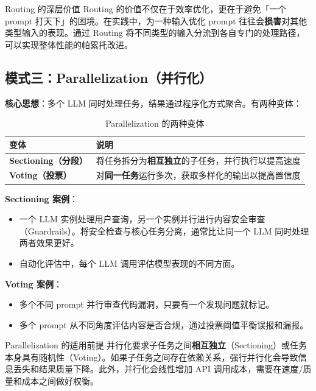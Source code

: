 \begin{knowledgebox}{Routing 的深层价值}
Routing 的价值不仅在于效率优化，更在于避免「一个 prompt 打天下」的困境。在实践中，为一种输入优化 prompt 往往会\textbf{损害}对其他类型输入的表现。通过 Routing 将不同类型的输入分流到各自专门的处理路径，可以实现整体性能的帕累托改进。
\end{knowledgebox}

\subsection{模式三：Parallelization（并行化）}

\textbf{核心思想}：多个 LLM 同时处理任务，结果通过程序化方式聚合。有两种变体：

\begin{table}[H]
\centering
\begin{tabular}{>{\bfseries}l p{10cm}}
\toprule
变体 & 说明 \\
\midrule
Sectioning（分段） & 将任务拆分为\textbf{相互独立}的子任务，并行执行以提高速度 \\
Voting（投票） & 对\textbf{同一任务}运行多次，获取多样化的输出以提高置信度 \\
\bottomrule
\end{tabular}
\caption{Parallelization 的两种变体}
\end{table}

\textbf{Sectioning 案例}：
\begin{itemize}
    \item 一个 LLM 实例处理用户查询，另一个实例并行进行内容安全审查（Guardrails）。将安全检查与核心任务分离，通常比让同一个 LLM 同时处理两者效果更好。
    \item 自动化评估中，每个 LLM 调用评估模型表现的不同方面。
\end{itemize}

\textbf{Voting 案例}：
\begin{itemize}
    \item 多个不同 prompt 并行审查代码漏洞，只要有一个发现问题就标记。
    \item 多个 prompt 从不同角度评估内容是否合规，通过投票阈值平衡误报和漏报。
\end{itemize}

\begin{warningbox}{Parallelization 的适用前提}
并行化要求子任务之间\textbf{相互独立}（Sectioning）或任务本身具有随机性（Voting）。如果子任务之间存在依赖关系，强行并行化会导致信息丢失和结果质量下降。此外，并行化会线性增加 API 调用成本，需要在速度/质量和成本之间做好权衡。
\end{warningbox}

